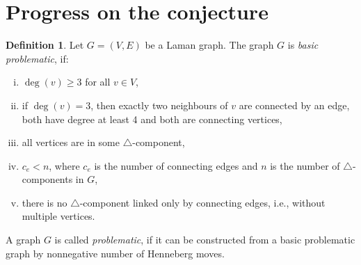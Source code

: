 \documentclass[a4paper, 11pt]{article}
\newcommand{\trcomp}{$\triangle$-component}
\newcommand{\trcomps}{$\triangle$-components}
\theoremstyle{definition}
\newtheorem{defn}{Definition}[section]
\begin{document}
\section{Progress on the conjecture}
\begin{defn}
\label{def:problematicGraphs}
Let $G=(V,E)$ be a Laman graph. The graph $G$ is \textit{basic problematic}, if:
\begin{enumerate}[i)]
	\item  $\deg(v)\geq 3$ for all $v\in V$,
	\item  if $\deg(v) =3$, then exactly two neighbours of $v$ are connected by an edge, both have degree at least 4 and both are connecting vertices,
	\item  all vertices are in some \trcomp{},
	\item $c_e<n$, where $c_e$ is the number of connecting edges and $n$ is the number of \trcomps{} in $G$,
	\item there is no \trcomp{} linked only by connecting edges, i.e., without multiple vertices.
\end{enumerate}
A graph $G$ is called \emph{problematic}, if it can be constructed from a basic problematic graph by nonnegative number of Henneberg moves.%
\end{defn}
\end{document}

